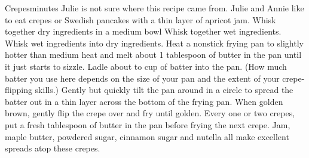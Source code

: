 \begin{recipe}{Crepes}{\unit[]{}}{\unit[20]{minutes}}
\freeform Julie is not sure where this recipe came from. Julie and Annie like to eat crepes or Swedish pancakes with a thin layer of apricot jam. 
Whisk together dry ingredients in a medium bowl
Whisk together wet ingredients. Whisk wet ingredients into dry ingredients.
\freeform Heat a nonstick frying pan to slightly hotter than medium heat and melt about 1 tablespoon of butter in the pan until it just starts to sizzle. Ladle about  to  cup of batter into the pan. (How much batter you use here depends on the size of your pan and the extent of your crepe-flipping skills.) Gently but quickly tilt the pan around in a circle to spread the batter out in a thin layer across the bottom of the frying pan. When golden brown, gently flip the crepe over and fry until golden. 
Every one or two crepes, put  a fresh tablespoon of butter in the pan before frying the next crepe.
Jam, maple butter, powdered sugar, cinnamon sugar and nutella all make excellent spreads atop these crepes.
\end{recipe}